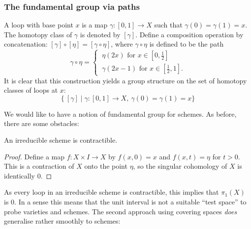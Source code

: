 \subsubsection{The fundamental group via paths}
A loop with base point $x$ is a map $\gamma : [0,1] \to X$ such that $\gamma(0) = \gamma(1) = x$. The homotopy class of $\gamma $ is denoted by $[\gamma]$. Define a composition operation by concatenation: $[\gamma] \circ [\eta] = [\gamma \circ \eta]$, where $\gamma \circ \eta$ is defined to be the path
\[
	\gamma \circ \eta =
	\begin{cases}
		\ \eta(2x) \text{ for } x \in [0, \tfrac{1}{2}] \\
		\ \gamma(2x - 1) \text{ for } x \in [\tfrac{1}{2}, 1].
	\end{cases}
\]
It is clear that this construction yields a group structure on the set of homotopy classes of loops at $x$:
\[
	\{\ [\gamma] \mid \gamma : [0,1] \to X,\ \gamma(0) = \gamma(1) = x \}
\]

We would like to have a notion of fundamental group for schemes. As before, there are some obstacles:

\begin{proposition}\label{scheme_contractible}
	An irreducible scheme is contractible.
\end{proposition}

\begin{proof}
	Define a map $f: X \times I \to X$  by $f(x,0) = x$ and $f(x,t) = \eta$ for $t > 0$. This is a contraction of $X$ onto the point $\eta$, so the singular cohomology of $X$ is identically 0.
\end{proof}

\begin{remark}
	As every loop in an irreducible scheme is contractible, this implies that $\pi_1(X)$ is $0$. In a sense this means that the unit interval is not a suitable ``test space'' to probe varieties and schemes. The second approach using covering spaces \textit{does} generalise rather smoothly to schemes:
\end{remark}

